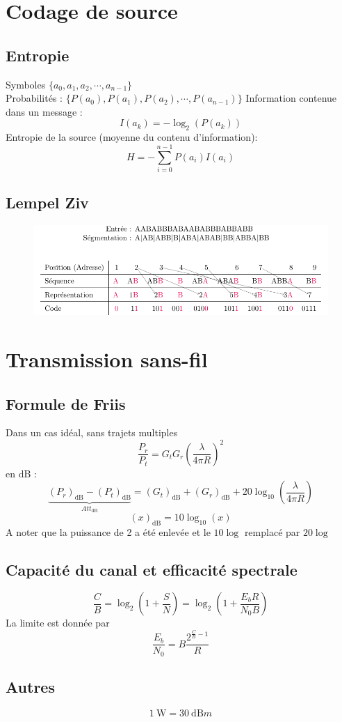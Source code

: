 \documentclass[]{article}
\begin{document}
\begin{multicols}{3}
\section{Codage de source}
\subsection{Entropie}
Symboles $\lbrace a_0, a_1, a_2, \cdots, a_{n-1}\rbrace$\\
Probabilités : $\lbrace P(a_0), P(a_1), P(a_2), \cdots, P(a_{n-1})\rbrace$
Information contenue dans un message :
$$I(a_k)=-\log_2(P(a_k))$$
Entropie de la source (moyenne du contenu d'information):
$$H=-\sum_{i=0}^{n-1}P(a_i)I(a_i)$$



\subsection{Lempel Ziv}
\begin{figure}[H]
\centering
\includegraphics[width=\columnwidth]{drwg_0.pdf}
\end{figure}




\section{Transmission sans-fil}
\subsection{Formule de Friis}
Dans un cas idéal, sans trajets multiples
$$\frac{P_r}{P_t}=G_tG_r\left(\frac{\lambda}{4\pi R}\right)^2$$
en \si{\deci\bel} : 
$$\underbrace{(P_r)_{\si{\deci\bel}}-(P_t)_{\si{\deci\bel}}}_{Att_{\si{\deci\bel}}}=(G_t)_{\si{\deci\bel}}+(G_r)_{\si{\deci\bel}}+20\log_{10}\left(\frac{\lambda}{4\pi R}\right)$$
$$(x)_{\si{\deci\bel}}=10\log_{10}(x)$$
A noter que la puissance de 2 a été enlevée et le $10\log$ remplacé par $20\log$
\subsection{Capacité du canal et efficacité spectrale}
$$\frac{C}{B}=\log_2\left(1+\frac{S}{N}\right)=\log_2\left(1+\frac{E_bR}{N_0B}\right)$$
La limite est donnée par
$$\frac{E_b}{N_0}=B\frac{2^{\frac{C}{B}-1}}{R}$$
\subsection{Autres}
$$\SI{1}{\watt}=\SI{30}{\deci\bel m}$$

\end{multicols}
\end{document}
